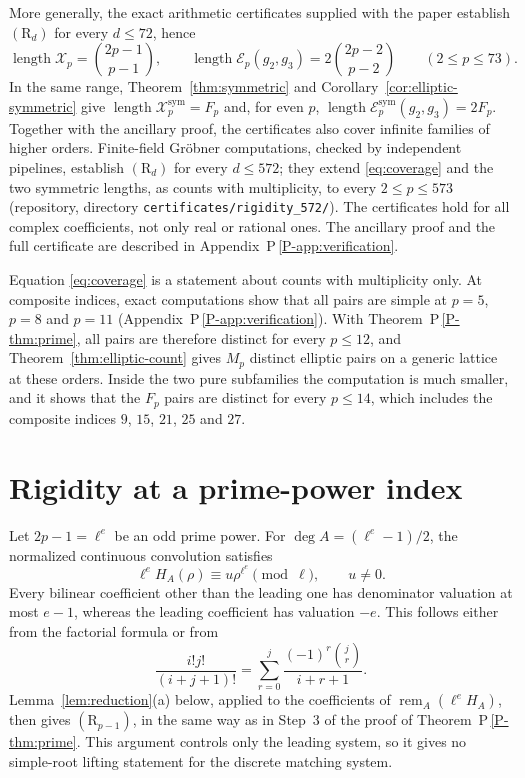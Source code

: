\documentclass[11pt]{article}
\newcommand{\remA}{\operatorname{rem}_{A}}
\newcommand{\len}{\operatorname{length}}
\newcommand{\Xp}{\mathcal X_p}
\numberwithin{equation}{section}
\begin{document}
More generally, the exact arithmetic certificates supplied with the
paper establish \((\mathrm R_d)\) for every \(d\le72\), hence
\begin{equation}\label{eq:coverage}
 \len\Xp=\binom{2p-1}{p-1},\qquad
 \len\mathcal E_p(g_2,g_3)=2\binom{2p-2}{p-2}
 \qquad(2\le p\le73).
\end{equation}
In the same range, Theorem~\ref{thm:symmetric} and
Corollary~\ref{cor:elliptic-symmetric} give
\(\len\Xp^{\mathrm{sym}}=F_p\) and, for even \(p\),
\(\len\mathcal E_p^{\mathrm{sym}}(g_2,g_3)=2F_p\).
Together with the ancillary proof, the certificates also cover infinite
families of higher orders.
Finite-field Gr\"obner computations, checked by independent pipelines,
establish \((\mathrm R_d)\) for every \(d\le572\); they extend
\eqref{eq:coverage} and the two symmetric lengths, as counts with
multiplicity, to every \(2\le p\le573\) (repository, directory
\texttt{certificates/rigidity\_572/}).
The certificates hold for all complex coefficients, not only real or
rational ones. The ancillary proof and the full certificate are described
in Appendix~P\,\ref{P-app:verification}.

Equation \eqref{eq:coverage} is a statement about counts with
multiplicity only. At composite indices, exact computations show that
all pairs are simple at \(p=5\), \(p=8\) and \(p=11\)
(Appendix~P\,\ref{P-app:verification}). With Theorem~P\,\ref{P-thm:prime}, all
pairs are therefore distinct for every \(p\le12\), and
Theorem~\ref{thm:elliptic-count} gives \(M_p\) distinct elliptic pairs
on a generic lattice at these orders. Inside the two pure subfamilies
the computation is much smaller, and it shows that the \(F_p\) pairs
are distinct for every \(p\le14\), which includes the composite indices
\(9\), \(15\), \(21\), \(25\) and \(27\).

\section{Rigidity at a prime-power index}\label{sec:prime-powers}

Let \(2p-1=\ell^e\) be an odd prime power. For
\(\deg A=(\ell^e-1)/2\), the normalized continuous convolution
satisfies
\[
 \ell^eH_A(\rho)\equiv u\rho^{\ell^e}\pmod\ell,\qquad u\ne0.
\]
Every bilinear coefficient other than the leading one has
denominator valuation at most \(e-1\), whereas the leading
coefficient has valuation \(-e\).
This follows either from the factorial formula or from
\[
 \frac{i!j!}{(i+j+1)!}
   =\sum_{r=0}^{j}\frac{(-1)^r\binom jr}{i+r+1}.
\]
Lemma~\ref{lem:reduction}(a) below, applied to the coefficients of
\(\remA(\ell^eH_A)\), then gives \((\mathrm R_{p-1})\), in the same way
as in Step~3 of the proof of Theorem~P\,\ref{P-thm:prime}. This
argument controls only the leading system, so it gives no simple-root
lifting statement for the discrete matching system.
\end{document}
